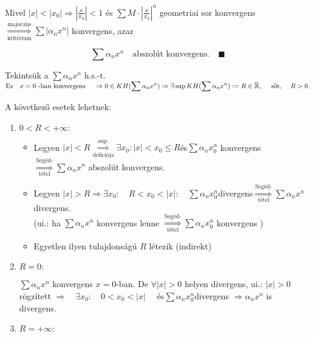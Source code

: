 \documentclass[a4paper,11.5pt]{article}
\begin{document}
\begin{enumerate}
\begin{itemize}[~~~~~~~~~]
			Mivel $|x|<|x_0|\Rightarrow\left|\displaystyle\frac{x}{x_0}\right|<1$ és $\displaystyle\sum M\cdot \left|\frac{x}{x_0}\right|^n$ geometriai sor konvergens $\overset{\text{majoráns}}{\underset{\text{kritérium}}{\Longrightarrow}}\displaystyle\sum|\alpha_nx^n|$ konvergens, azaz 
			
			\[ \sum\alpha_nx^n\quad \text{abszolút konvergens.}\quad \blacksquare \]
		\end{itemize}
		Tekintsük a $\displaystyle\sum\alpha_nx^n$ h.s.-t. $ \displaystyle\text{Ez}\quad  x=0\text{~-ban konvergens }  \quad \Rightarrow 0 \in KH(\sum\alpha_nx^n) \Rightarrow \exists \sup KH(\sum\alpha_nx^n):=R\in\overline{\mathbb{R}},\quad\text{ sőt, }\quad R>0.$
		
		A következő esetek lehetnek:
		\begin{enumerate}
			\item $0<R<+\infty:$
			\begin{itemize}
				\item Legyen $|x|<R \overset{\text{sup.}}{\underset{\text{defíciója}}{\Longrightarrow}} \exists x_0: |x|<x_0\leq R$\quad  és\quad $ \sum\alpha_nx^n_0$ \quad konvergens $\overset{\text{Segéd-}}{\underset{\text{tétel}}{\Longrightarrow}} \sum\alpha_nx^n$ abszolút konvergens.\\
				
				\item Legyen $|x|>R \Rightarrow \exists x_0:\quad  R<x_0<|x|:\quad \sum\alpha_nx^n_0$\quad divergens\quad $\overset{\text{Segéd-}}{\underset{\text{tétel}}{\Longrightarrow}} \sum \alpha_nx^n$ \quad divergens.\\
				
				(ui.: ha $\sum \alpha_nx^n$ konvergens lenne $\overset{\text{Segéd-}}{\underset{\text{tétel}}{\Longrightarrow}} \sum \alpha_n x_0^n$ konvergens {\Large\Lightning})
				
				\item Egyetlen ilyen tulajdonságú $R$ létezik (indirekt)
			\end{itemize}
			\item $R=0:$
			
			$ \displaystyle\sum\alpha_nx^n$ \quad konvergens $x=0$-ban. De $\forall |x|>0$ helyen divergens, ui.: \quad $|x|>0$ rögzített \quad $\Rightarrow\quad \exists x_0: \quad 0<x_0<|x| \quad$ és\quad $\displaystyle\sum\alpha_nx^n_0$\quad divergens $\Rightarrow \alpha_nx^n$ is divergens.
			
			\item $R=+\infty$:
			

\end{enumerate}
\end{enumerate}
\end{document}
